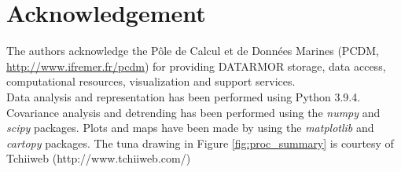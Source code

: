 \documentclass[review, 12pt]{elsarticle}
\begin{document}






\section*{Acknowledgement}

The authors acknowledge the Pôle de Calcul et de Données Marines (PCDM, \url{http://www.ifremer.fr/pcdm}) for providing DATARMOR storage, data access, computational resources, visualization and support services.\\
Data analysis and representation has been performed using Python 3.9.4. 
Covariance analysis and detrending has been performed using the \emph{numpy} and \emph{scipy} packages. Plots and maps have been made by using the \emph{matplotlib} and \emph{cartopy} packages. The tuna drawing in Figure \ref{fig:proc_summary} is courtesy of Tchiiweb (http://www.tchiiweb.com/)

\listoffigures
\listoftables

\clearpage


\end{document}
